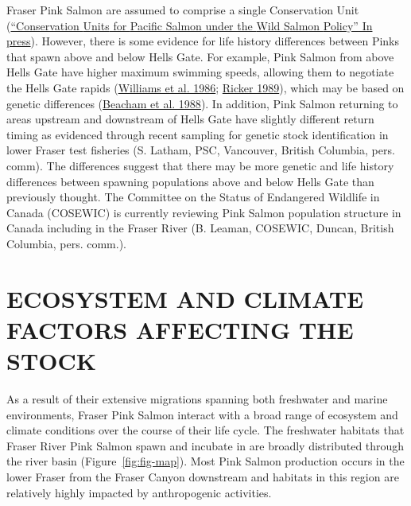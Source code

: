 \documentclass[11pt]{book}
\begin{document}
Fraser Pink Salmon are assumed to comprise a single Conservation Unit (\protect\hyperlink{ref-holtbyConservationUnitsPacific2008}{{``Conservation {Units} for {Pacific Salmon} under the {W}ild {S}almon {P}olicy''} In press}). However, there is some evidence for life history differences between Pinks that spawn above and below Hells Gate. For example, Pink Salmon from above Hells Gate have higher maximum swimming speeds, allowing them to negotiate the Hells Gate rapids (\protect\hyperlink{ref-williams1983EarlyRun1986}{Williams et al. 1986}; \protect\hyperlink{ref-rickerHistoryPresentState1989}{Ricker 1989}), which may be based on genetic differences (\protect\hyperlink{ref-beachamVariationBodySize1988}{Beacham et al. 1988}). In addition, Pink Salmon returning to areas upstream and downstream of Hells Gate have slightly different return timing as evidenced through recent sampling for genetic stock identification in lower Fraser test fisheries (S. Latham, PSC, Vancouver, British Columbia, pers. comm). The differences suggest that there may be more genetic and life history differences between spawning populations above and below Hells Gate than previously thought. The Committee on the Status of Endangered Wildlife in Canada (COSEWIC) is currently reviewing Pink Salmon population structure in Canada including in the Fraser River (B. Leaman, COSEWIC, Duncan, British Columbia, pers. comm.).

\hypertarget{ecosystem-and-climate-factors-affecting-the-stock}{%
\section{ECOSYSTEM AND CLIMATE FACTORS AFFECTING THE STOCK}\label{ecosystem-and-climate-factors-affecting-the-stock}}

As a result of their extensive migrations spanning both freshwater and marine environments, Fraser Pink Salmon interact with a broad range of ecosystem and climate conditions over the course of their life cycle. The freshwater habitats that Fraser River Pink Salmon spawn and incubate in are broadly distributed through the river basin (Figure~\ref{fig:fig-map}). Most Pink Salmon production occurs in the lower Fraser from the Fraser Canyon downstream and habitats in this region are relatively highly impacted by anthropogenic activities.
\end{document}
